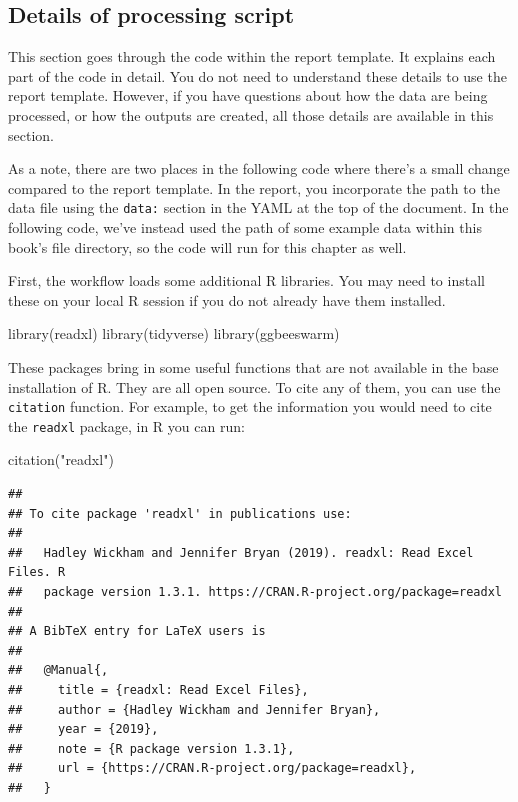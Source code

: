 \documentclass[
]{book}
\newenvironment{Shaded}{\begin{snugshade}}{\end{snugshade}}
\newcommand{\FunctionTok}[1]{\textcolor[rgb]{0.00,0.00,0.00}{#1}}
\newcommand{\NormalTok}[1]{#1}
\newcommand{\StringTok}[1]{\textcolor[rgb]{0.31,0.60,0.02}{#1}}
\begin{document}
\hypertarget{details-of-processing-script}{%
\subsection{Details of processing script}\label{details-of-processing-script}}

This section goes through the code within the report template. It
explains each part of the code in detail. You do not need to understand
these details to use the report template. However, if you have questions
about how the data are being processed, or how the outputs are created,
all those details are available in this section.

As a note, there are two places in the following code where there's a small
change compared to the report template. In the report, you incorporate the path
to the data file using the \texttt{data:} section in the YAML at the top of the
document. In the following code, we've instead used the path of some example
data within this book's file directory, so the code will run for this chapter as
well.

First, the workflow loads some additional R libraries. You may need to install
these on your local R session if you do not already have them installed.

\begin{Shaded}
\begin{Highlighting}[]
\FunctionTok{library}\NormalTok{(readxl)}
\FunctionTok{library}\NormalTok{(tidyverse)}
\FunctionTok{library}\NormalTok{(ggbeeswarm)}
\end{Highlighting}
\end{Shaded}

These packages bring in some useful functions that are not available in the
base installation of R. They are all open source. To cite any of them, you
can use the \texttt{citation} function. For example, to get the information you would
need to cite the \texttt{readxl} package, in R you can run:

\begin{Shaded}
\begin{Highlighting}[]
\FunctionTok{citation}\NormalTok{(}\StringTok{"readxl"}\NormalTok{)}
\end{Highlighting}
\end{Shaded}

\begin{verbatim}
## 
## To cite package 'readxl' in publications use:
## 
##   Hadley Wickham and Jennifer Bryan (2019). readxl: Read Excel Files. R
##   package version 1.3.1. https://CRAN.R-project.org/package=readxl
## 
## A BibTeX entry for LaTeX users is
## 
##   @Manual{,
##     title = {readxl: Read Excel Files},
##     author = {Hadley Wickham and Jennifer Bryan},
##     year = {2019},
##     note = {R package version 1.3.1},
##     url = {https://CRAN.R-project.org/package=readxl},
##   }
\end{verbatim}
\end{document}
